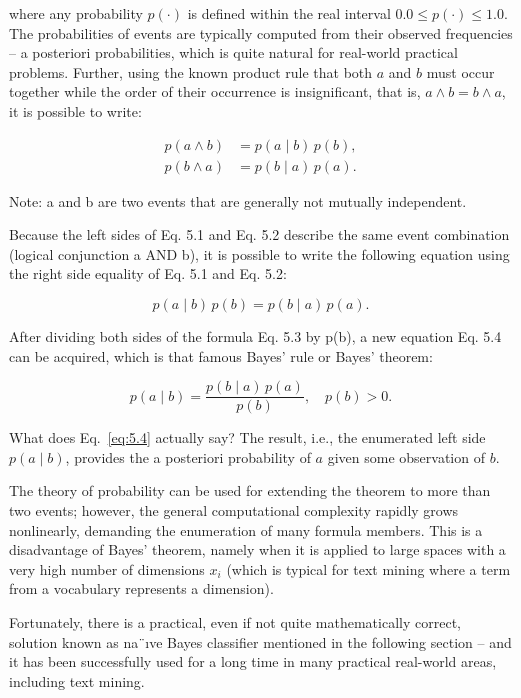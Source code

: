 where any probability $p(\cdot)$ is defined within the real interval 
$
0.0 \le p(\cdot) \le 1.0.
$
The probabilities of events are typically computed from their observed frequencies – a posteriori probabilities, which is quite natural for real-world practical
problems. Further, using the known product rule that both $a$ and $b$ must occur
together while the order of their occurrence is insignificant, that is, $a \wedge b = b \wedge a$,
it is possible to write:

\begin{align}
p(a \wedge b) &= p(a \mid b) \, p(b), \label{eq:5.1} \\
p(b \wedge a) &= p(b \mid a) \, p(a). \label{eq:5.2}
\end{align}

Note: a and b are two events that are generally not mutually independent.

Because the left sides of Eq. 5.1 and Eq. 5.2 describe the same event combination (logical conjunction a AND b), it is possible to write the following equation
using the right side equality of Eq. 5.1 and Eq. 5.2:

\begin{equation}
p(a \mid b) \, p(b) = p(b \mid a) \, p(a). \label{eq:5.3}
\end{equation}

After dividing both sides of the formula Eq. 5.3 by p(b), a new equation
Eq. 5.4 can be acquired, which is that famous Bayes’ rule or Bayes’ theorem:

\begin{equation}
p(a \mid b) = \frac{p(b \mid a) \, p(a)}{p(b)}, \quad p(b) > 0. \label{eq:5.4}
\end{equation}

What does Eq.~\eqref{eq:5.4} actually say? The result, i.e., the enumerated left side 
$p(a\mid b)$, provides the a posteriori probability of $a$ given some observation of $b$.

The theory of probability can be used for extending the theorem to more than
two events; however, the general computational complexity rapidly grows nonlinearly, demanding the enumeration of many formula members. This is a disadvantage of Bayes’ theorem, namely when it is applied to large spaces with a very
high number of dimensions $x_i$ (which is typical for text mining where a term
from a vocabulary represents a dimension).

Fortunately, there is a practical, even if not quite mathematically correct, solution known as na¨ıve Bayes classifier mentioned in the following section – and
it has been successfully used for a long time in many practical real-world areas,
including text mining.

